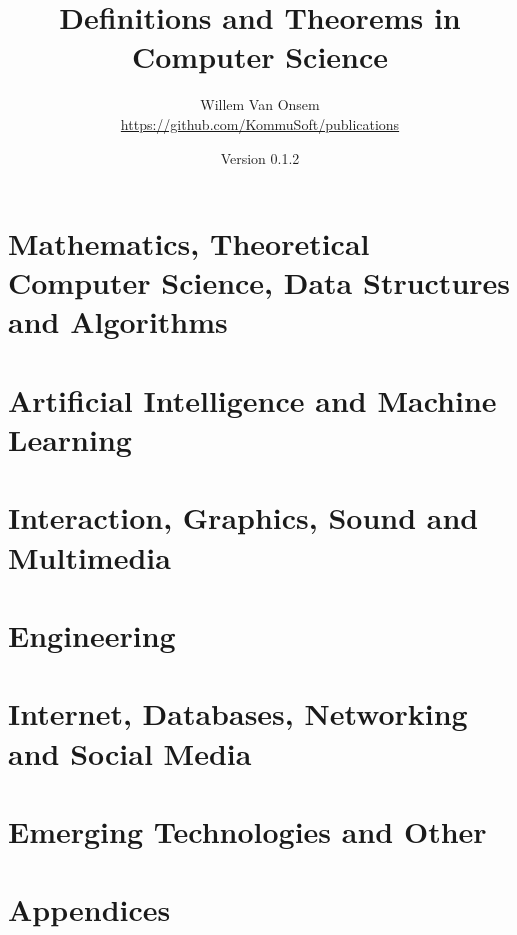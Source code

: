 \documentclass{book}
\title{Definitions and Theorems in Computer Science}
\author{Willem Van Onsem\\\url{https://github.com/KommuSoft/publications}}
\date{Version 0.1.2}
\begin{document}
\frontmatter
\begin{titlepage}
\maketitle
\end{titlepage}
\tableofcontents


\mainmatter

\part{Mathematics, Theoretical Computer Science, Data Structures and Algorithms}










\part{Artificial Intelligence and Machine Learning}











\part{Interaction, Graphics, Sound and Multimedia}






\part{Engineering}







\part{Internet, Databases, Networking and Social Media}








\part{Emerging Technologies and Other}




\appendix
\backmatter

\part{Appendices}

\begin{twocolumn}
\listoffigures
\listoftables


\printindex
\end{twocolumn}
\end{document}
